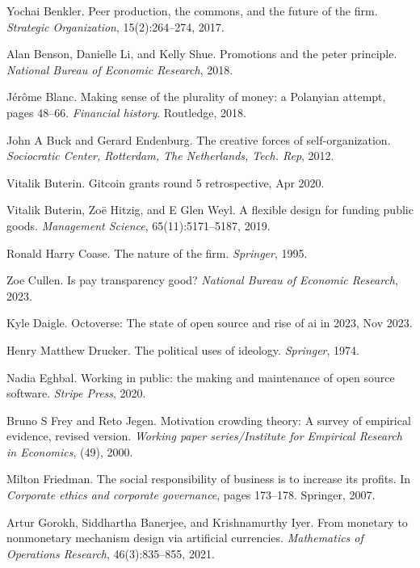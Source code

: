 \documentclass{article}
\begin{document}
\begin{thebibliography}{99}
Yochai Benkler. Peer production, the commons, and the future of the firm. \textit{Strategic Organization}, 15(2):264--274, 2017.

Alan Benson, Danielle Li, and Kelly Shue. Promotions and the peter principle. \textit{National Bureau of Economic Research}, 2018.

Jérôme Blanc. Making sense of the plurality of money: a Polanyian attempt, pages 48--66. \textit{Financial history}. Routledge, 2018.

John A Buck and Gerard Endenburg. The creative forces of self-organization. \textit{Sociocratic Center, Rotterdam, The Netherlands, Tech. Rep}, 2012.

Vitalik Buterin. Gitcoin grants round 5 retrospective, Apr 2020.

Vitalik Buterin, Zoë Hitzig, and E Glen Weyl. A flexible design for funding public goods. \textit{Management Science}, 65(11):5171--5187, 2019.

Ronald Harry Coase. The nature of the firm. \textit{Springer}, 1995.

Zoe Cullen. Is pay transparency good? \textit{National Bureau of Economic Research}, 2023.

Kyle Daigle. Octoverse: The state of open source and rise of ai in 2023, Nov 2023.

Henry Matthew Drucker. The political uses of ideology. \textit{Springer}, 1974.

Nadia Eghbal. Working in public: the making and maintenance of open source software. \textit{Stripe Press}, 2020.

Bruno S Frey and Reto Jegen. Motivation crowding theory: A survey of empirical evidence, revised version. \textit{Working paper series/Institute for Empirical Research in Economics}, (49), 2000.

Milton Friedman. The social responsibility of business is to increase its profits. In \textit{Corporate ethics and corporate governance}, pages 173--178. Springer, 2007.

Artur Gorokh, Siddhartha Banerjee, and Krishnamurthy Iyer. From monetary to nonmonetary mechanism design via artificial currencies. \textit{Mathematics of Operations Research}, 46(3):835--855, 2021.


\end{thebibliography}
\end{document}
